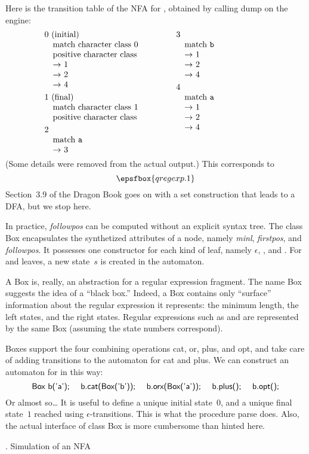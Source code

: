 Here is the transition table of the NFA for , obtained by calling {\sf dump} on the engine:  $$\vtop{\hsize=0.4\hsize\obeylines
  $0$ (initial)
  \quad match character class $0$
  \quad positive character class
  \quad $\rightarrow$ $1$
  \quad $\rightarrow$ $2$
  \quad $\rightarrow$ $4$
\smallskip
  $1$ (final)
  \quad match character class $1$
  \quad positive character class
\smallskip
  $2$
  \quad match {\tt a}
  \quad $\rightarrow$ $3$
}\qquad\vtop{\hsize=0.4\hsize\obeylines
  $3$
  \quad match {\tt b}
  \quad $\rightarrow$ $1$
  \quad $\rightarrow$ $2$
  \quad $\rightarrow$ $4$
\smallskip
  $4$
  \quad match {\tt a}
  \quad $\rightarrow$ $1$
  \quad $\rightarrow$ $2$
  \quad $\rightarrow$ $4$
}$$  (Some details were removed from the actual output.)  This corresponds to $$\epsfbox{qregexp.1}$$  Section~3.9 of the Dragon Book goes on with a set construction that leads to a DFA, but we stop here.

In practice, {\it followpos\/} can be computed without an explicit syntax tree.  The class {\sf Box} encapsulates the synthetized attributes of a node, namely {\it minl}, {\it firstpos}, and {\it followpos}.  It possesses one constructor for each kind of leaf, namely $\epsilon$, , and .  For  and  leaves, a new state~$s$ is created in the automaton.

A {\sf Box} is, really, an abstraction for a regular expression fragment.  The name {\sf Box} suggests the idea of a ``black box.''  Indeed, a {\sf Box} contains only ``surface'' information about the regular expression it represents:  the minimum length, the left states, and the right states.  Regular expressions such as  and  are represented by the same {\sf Box} (assuming the state numbers correspond).

Boxes support the four combining operations {\sf cat}, {\sf or}, {\sf plus}, and {\sf opt}, and take care of adding transitions to the automaton for {\sf cat} and {\sf plus}.  We can construct an automaton for  in this way:  $$\hbox{\sf Box b('a'); \quad b.cat(Box('b')); \quad b.orx(Box('a')); \quad b.plus(); \quad b.opt();}$$  Or almost so\dots{} It is useful to define a unique initial state~$0$, and a unique final state~$1$ reached using $\epsilon$-transitions.  This is what the procedure {\sf parse} does.  Also, the actual interface of class {\sf Box} is more cumbersome than hinted here.

. Simulation of an NFA

